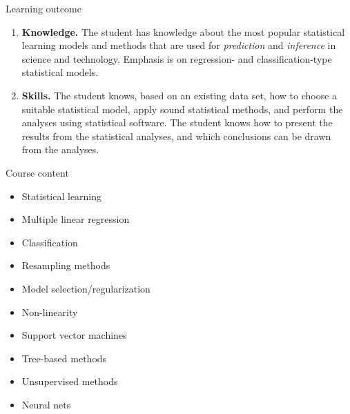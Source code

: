 \documentclass[ignorenonframetext,]{beamer}
\providecommand{\tightlist}{%
  \setlength{\itemsep}{0pt}\setlength{\parskip}{0pt}}
\begin{document}
\begin{frame}

\begin{block}{Learning outcome}

\begin{enumerate}
\def\labelenumi{\arabic{enumi}.}
\item
  \textbf{Knowledge.} The student has knowledge about the most popular
  statistical learning models and methods that are used for
  \emph{prediction} and \emph{inference} in science and technology.
  Emphasis is on regression- and classification-type statistical models.
\item
  \textbf{Skills.} The student knows, based on an existing data set, how
  to choose a suitable statistical model, apply sound statistical
  methods, and perform the analyses using statistical software. The
  student knows how to present the results from the statistical
  analyses, and which conclusions can be drawn from the analyses.
\end{enumerate}

\end{block}

\end{frame}

\begin{frame}

\begin{block}{Course content}

\vspace{2mm}

\begin{itemize}
\tightlist
\item
  Statistical learning
\item
  Multiple linear regression
\item
  Classification
\item
  Resampling methods
\item
  Model selection/regularization
\item
  Non-linearity
\item
  Support vector machines
\item
  Tree-based methods
\item
  Unsupervised methods
\item
  Neural nets
\end{itemize}

\end{block}

\end{frame}
\end{document}
